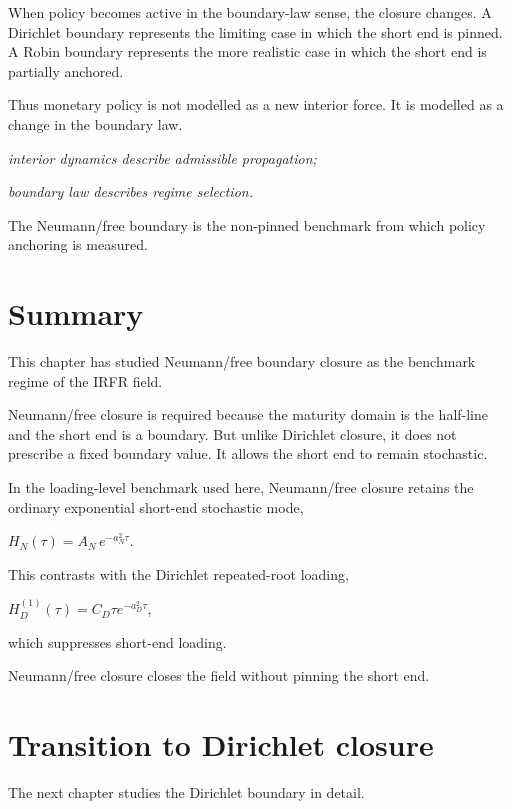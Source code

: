 \documentclass[11pt,oneside]{book}
\begin{document}
When policy becomes active in the boundary-law sense, the closure
changes. A Dirichlet boundary represents the limiting case in which the
short end is pinned. A Robin boundary represents the more realistic case
in which the short end is partially anchored.

Thus monetary policy is not modelled as a new interior force. It is
modelled as a change in the boundary law.

\begin{center}\emph{interior dynamics describe admissible propagation;}\end{center}

\begin{center}\emph{boundary law describes regime selection.}\end{center}

The Neumann/free boundary is the non-pinned benchmark from which policy
anchoring is measured.

\section{Summary}\label{summary-3}

This chapter has studied Neumann/free boundary closure as the benchmark
regime of the IRFR field.

Neumann/free closure is required because the maturity domain is the half-line
and the short end is a boundary. But unlike Dirichlet closure, it does
not prescribe a fixed boundary value. It allows the short end to remain
stochastic.

In the loading-level benchmark used here, Neumann/free closure retains
the ordinary exponential short-end stochastic mode,

$H_N(\tau)=A_N\,e^{-a_N^2\tau}$.

This contrasts with the Dirichlet repeated-root loading,

$H_D^{(1)}(\tau)=C_D\tau e^{-a_D^2\tau}$,

which suppresses short-end loading.

Neumann/free closure closes the field without pinning the short end.

\section{Transition to Dirichlet
closure}\label{transition-to-dirichlet-closure}

The next chapter studies the Dirichlet boundary in detail.
\end{document}
